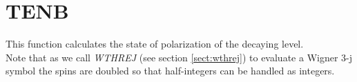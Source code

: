 \section{TENB}
\label{sect:tenb}

\noindent This function calculates the state of polarization of the decaying
level.\\

\noindent Note that as we call {\em WTHREJ} (see section \ref{sect:wthrej}) to
evaluate a Wigner 3-j symbol the spins are doubled so that half-integers can
be handled as integers.\\
